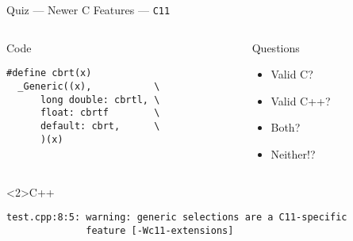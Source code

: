 \documentclass[presentation,aspectratio=169]{beamer}
\begin{document}
\begin{frame}[fragile,label={sec:org23c4234}]{Quiz — Newer C Features — \texttt{C11}}
 \begin{columns}
\begin{column}{0.48\columnwidth}
\begin{block}{Code}
\begin{verbatim}
#define cbrt(x)
  _Generic((x),           \
      long double: cbrtl, \
      float: cbrtf        \
      default: cbrt,      \
      )(x)
\end{verbatim}
\end{block}
\end{column}

\begin{column}{0.48\columnwidth}
\begin{block}{Questions}
\begin{itemize}
\item Valid C?
\item Valid C++?
\item Both?
\item Neither!?
\end{itemize}
\end{block}
\end{column}
\end{columns}

\begin{block}<2>{C++}
\begin{verbatim}
test.cpp:8:5: warning: generic selections are a C11-specific
              feature [-Wc11-extensions]
\end{verbatim}
\end{block}
\end{frame}

\end{document}
